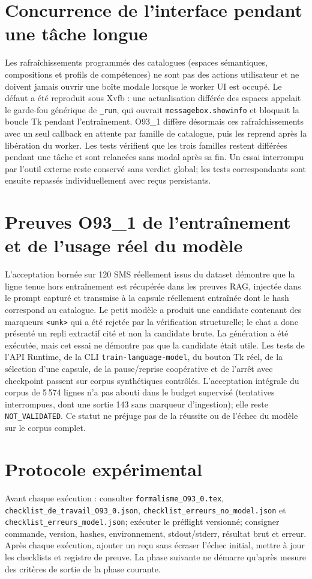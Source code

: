\documentclass[11pt,a4paper]{article}
\begin{document}
\section{Concurrence de l'interface pendant une tâche longue}
Les rafraîchissements programmés des catalogues (espaces sémantiques, compositions et profils de compétences) ne sont pas des actions utilisateur et ne doivent jamais ouvrir une boîte modale lorsque le worker UI est occupé. Le défaut a été reproduit sous Xvfb : une actualisation différée des espaces appelait le garde-fou générique de \texttt{\_run}, qui ouvrait \texttt{messagebox.showinfo} et bloquait la boucle Tk pendant l'entraînement. O93\_1 diffère désormais ces rafraîchissements avec un seul callback en attente par famille de catalogue, puis les reprend après la libération du worker. Les tests vérifient que les trois familles restent différées pendant une tâche et sont relancées sans modal après sa fin. Un essai interrompu par l'outil externe reste conservé sans verdict global; les tests correspondants sont ensuite repassés individuellement avec reçus persistants.

\section{Preuves O93\_1 de l'entraînement et de l'usage réel du modèle}
L'acceptation bornée sur 120 SMS réellement issus du dataset démontre que la ligne tenue hors entraînement est récupérée dans les preuves RAG, injectée dans le prompt capturé et transmise à la capsule réellement entraînée dont le hash correspond au catalogue. Le petit modèle a produit une candidate contenant des marqueurs \texttt{<unk>} qui a été rejetée par la vérification structurelle; le chat a donc présenté un repli extractif cité et non la candidate brute. La génération a été exécutée, mais cet essai ne démontre pas que la candidate était utile. Les tests de l'API Runtime, de la CLI \texttt{train-language-model}, du bouton Tk réel, de la sélection d'une capsule, de la pause/reprise coopérative et de l'arrêt avec checkpoint passent sur corpus synthétiques contrôlés. L'acceptation intégrale du corpus de 5\,574 lignes n'a pas abouti dans le budget supervisé (tentatives interrompues, dont une sortie 143 sans marqueur d'ingestion); elle reste \texttt{NOT\_VALIDATED}. Ce statut ne préjuge pas de la réussite ou de l'échec du modèle sur le corpus complet.

\section{Protocole expérimental}
Avant chaque exécution : consulter \texttt{formalisme\_O93\_0.tex}, \texttt{checklist\_de\_travail\_O93\_0.json}, \texttt{checklist\_erreurs\_no\_model.json} et \texttt{checklist\_erreurs\_model.json}; exécuter le préflight versionné; consigner commande, version, hashes, environnement, stdout/stderr, résultat brut et erreur. Après chaque exécution, ajouter un reçu sans écraser l'échec initial, mettre à jour les checklists et registre de preuve. La phase suivante ne démarre qu'après mesure des critères de sortie de la phase courante.
\end{document}
